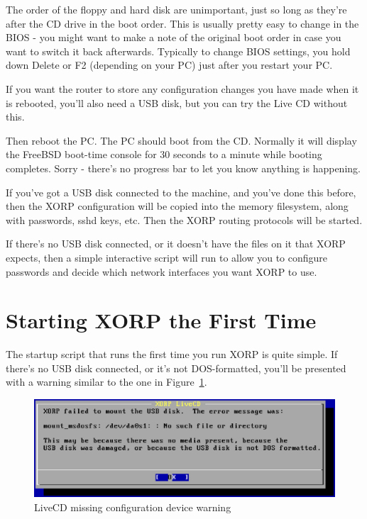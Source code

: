 The order of the floppy and hard disk are unimportant, just so
long as they're after the CD drive in the boot order.  This is usually
pretty easy to change in the BIOS - you might want to make a note of
the original boot order in case you want to switch it back afterwards.
Typically to change BIOS settings, you hold down Delete or F2
(depending on your PC) just after you restart your PC.

If you want the router to store any configuration changes you have made
when it is rebooted, you'll also need a USB disk, but you can try
the Live CD without this.

Then reboot the PC.  The PC should boot from the CD.  Normally it will
display the FreeBSD boot-time console for 30 seconds to a minute while
booting completes.  Sorry - there's no progress bar to let you know
anything is happening.

If you've got a USB disk connected to the machine, and you've done this
before, then the XORP configuration will be copied into the memory
filesystem, along with passwords, sshd keys, etc.  Then the XORP
routing protocols will be started.

If there's no USB disk connected, or it doesn't have the files on it
that XORP expects, then a simple interactive script will run to allow
you to configure passwords and decide which network interfaces you
want XORP to use.


\section{Starting XORP the First Time}

The startup script that runs the first time you run XORP is quite
simple. If there's no USB disk connected, or it's not DOS-formatted,
you'll be presented with a warning similar to the one in
Figure~\ref{fig:livecd:cd1}.

\begin{figure}[h]
  \begin{center}
    \includegraphics[width=6.0in]{figs/cd1}
    \caption{LiveCD missing configuration device warning}
    \label{fig:livecd:cd1}
  \end{center}
\end{figure}

